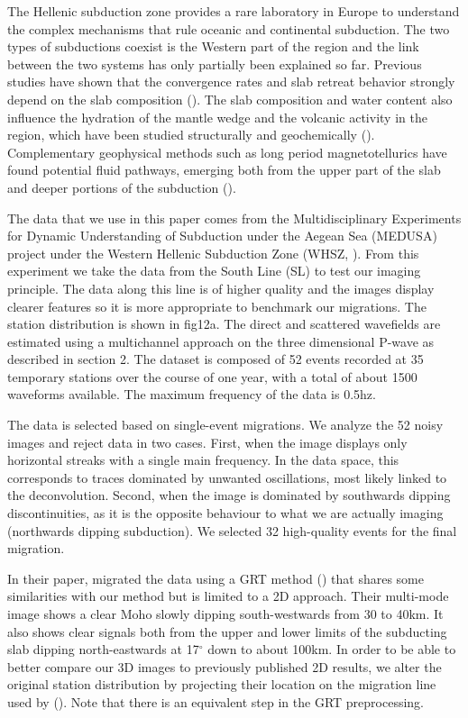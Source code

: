 \documentclass[10pt,a4paper]{article}
\numberwithin{equation}{section}
\DeclareRobustCommand{\rq}[1]{{\sethlcolor{myblue}\hl{#1}}}
\begin{document}
The Hellenic subduction zone provides a rare laboratory in Europe to understand the complex mechanisms that rule oceanic and continental subduction.
The two types of subductions coexist is the Western part of the region and the link between the two systems has only partially been explained so far.
Previous studies have shown that the convergence rates and slab retreat behavior strongly depend on the slab composition (\cite{papa_tecto_07}).
The slab composition and water content also influence the hydration of the mantle wedge and the volcanic activity in the region, which have been studied structurally and geochemically (\cite{pepi_gsa_07}).
Complementary geophysical methods such as long period magnetotellurics have found potential fluid pathways, emerging both from the upper part of the slab and deeper portions of the subduction (\cite{gala_tphy_05}).

The data that we use in this paper comes from the Multidisciplinary Experiments for Dynamic Understanding of Subduction under the Aegean Sea (MEDUSA) project under the Western Hellenic Subduction Zone (WHSZ, \cite{pear_jgr_12}).
From this experiment we take the data from the South Line (SL) to test our imaging principle.
The data along this line is of higher quality and the images display clearer features so it is more appropriate to benchmark our migrations.
The station distribution is shown in fig12a.
The direct and scattered wavefields are estimated using a multichannel approach on the three dimensional P-wave as described in section 2.
The dataset is composed of 52 events recorded at 35 temporary stations over the course of one year, with a total of about 1500 waveforms available.
The maximum frequency of the data is 0.5hz.

The data is selected based on single-event migrations.
We analyze the 52 noisy images and reject data in two cases.
First, when the image displays only horizontal streaks with a single main frequency.
In the data space, this corresponds to traces dominated by unwanted oscillations, most likely linked to the deconvolution.
Second, when the image is dominated by southwards dipping discontinuities, as it is the opposite behaviour to what we are actually imaging (northwards dipping subduction).
We selected 32 high-quality events for the final migration.

In their paper, \cite{pear_jgr_12} migrated the data using a GRT method (\cite{bost_jgr_01}) that shares some similarities with our method but is limited to a 2D approach.
Their multi-mode image shows a clear Moho slowly dipping south-westwards from 30 to 40km.
It also shows clear signals both from the upper and lower limits of the subducting slab dipping north-eastwards at 17$^{\circ}$ down to about 100km.
In order to be able to better compare our 3D images to previously published 2D results, we alter the original station distribution by projecting their location on the migration line used by (\cite{pear_jgr_12}).
Note that there is an equivalent step in the GRT preprocessing.
\end{document}
